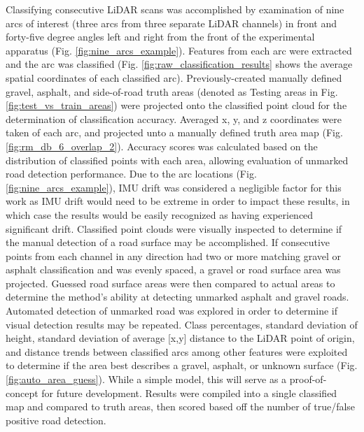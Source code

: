 \documentclass[journal,onecolumn]{IEEEtran}
\begin{document}
			{Classifying consecutive LiDAR scans was accomplished by examination of nine arcs of interest (three arcs from three separate LiDAR channels) in front and forty-five degree angles left and right from the front of the experimental apparatus (Fig. \ref{fig:nine_arcs_example}). Features from each arc were extracted and the arc was classified (Fig. \ref{fig:raw_classification_results} shows the average spatial coordinates of each classified arc). Previously-created manually defined gravel, asphalt, and side-of-road truth areas (denoted as Testing areas in Fig. \ref{fig:test_vs_train_areas}) were projected onto the classified point cloud for the determination of classification accuracy. Averaged x, y, and z coordinates were taken of each arc, and projected unto a manually defined truth area map (Fig. \ref{fig:rm_db_6_overlap_2}). Accuracy scores was calculated based on the distribution of classified points with each area, allowing evaluation of unmarked road detection performance. Due to the arc locations (Fig. \ref{fig:nine_arcs_example}), IMU drift was considered a negligible factor for this work as IMU drift would need to be extreme in order to impact these results, in which case the results would be easily recognized as having experienced significant drift. Classified point clouds were visually inspected to determine if the manual detection of a road surface may be accomplished. If consecutive points from each channel in any direction had two or more matching gravel or asphalt classification and was evenly spaced, a gravel or road surface area was projected. Guessed road surface areas were then compared to actual areas to determine the method's ability at detecting unmarked asphalt and gravel roads. Automated detection of unmarked road was explored in order to determine if visual detection results may be repeated. Class percentages, standard deviation of height, standard deviation of average [x,y] distance to the LiDAR point of origin, and distance trends between classified arcs among other features were exploited to determine if the area best describes a gravel, asphalt, or unknown surface (Fig. \ref{fig:auto_area_guess}). While a simple model, this will serve as a proof-of-concept for future development. Results were compiled into a single classified map and compared to truth areas, then scored based off the number of true/false positive road detection.  }
\end{document}
